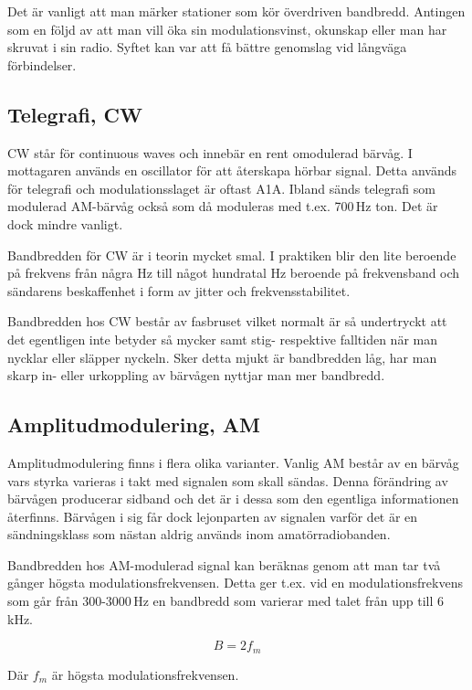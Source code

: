 Det är vanligt att man märker stationer som kör överdriven bandbredd. Antingen
som en följd av att man vill öka sin modulationsvinst, okunskap eller man har
skruvat i sin radio. Syftet kan var att få bättre genomslag vid långväga
förbindelser.

\subsection{Telegrafi, CW}

CW står för continuous waves och innebär en rent omodulerad bärvåg. I
mottagaren används en oscillator för att återskapa hörbar signal. Detta
används för telegrafi och modulationsslaget är oftast A1A. Ibland sänds
telegrafi som modulerad AM-bärvåg också som då moduleras med t.ex. 700\,Hz
ton. Det är dock mindre vanligt.

Bandbredden för CW är i teorin mycket smal. I praktiken blir den lite beroende
på frekvens från några Hz till något hundratal Hz beroende på frekvensband och
sändarens beskaffenhet i form av jitter och frekvensstabilitet.

Bandbredden hos CW består av fasbruset vilket normalt är så undertryckt att det
egentligen inte betyder så mycker samt stig- respektive falltiden när man
nycklar eller släpper nyckeln. Sker detta mjukt är bandbredden låg, har man
skarp in- eller urkoppling av bärvågen nyttjar man mer bandbredd.

\subsection{Amplitudmodulering, AM}

Amplitudmodulering finns i flera olika varianter. Vanlig AM består av en
bärvåg vars styrka varieras i takt med signalen som skall sändas. Denna
förändring av bärvågen producerar sidband och det är i dessa som den egentliga
informationen återfinns. Bärvågen i sig får dock lejonparten av signalen
varför det är en sändningsklass som nästan aldrig används inom
amatörradiobanden.

Bandbredden hos AM-modulerad signal kan beräknas genom att man tar två gånger
högsta modulationsfrekvensen. Detta ger t.ex. vid en modulationsfrekvens som
går från 300-3000\,Hz en bandbredd som varierar med talet från upp till
6\,kHz.

\begin{equation}
	B=2f_m
\end{equation}

Där $f_m$ är högsta modulationsfrekvensen.


